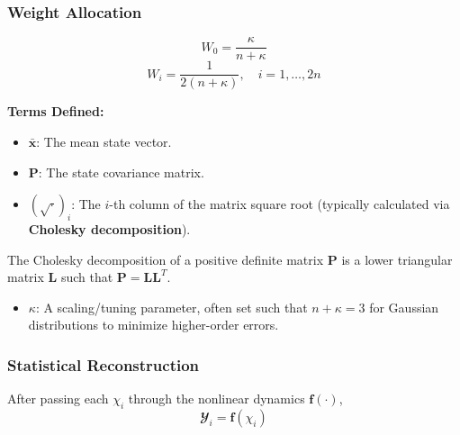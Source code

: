 \documentclass[
  letterpaper,
  DIV=11,
  numbers=noendperiod,
  oneside]{scrartcl}
\providecommand{\tightlist}{%
  \setlength{\itemsep}{0pt}\setlength{\parskip}{0pt}}
\begin{document}
\subsubsection{Weight Allocation}\label{weight-allocation}

\[W_0 = \frac{\kappa}{n + \kappa}\]
\[W_i = \frac{1}{2(n + \kappa)}, \quad i = 1, \dots, 2n\]

\textbf{Terms Defined:}

\begin{itemize}
\item
  \(\bar{\mathbf{x}}\): The mean state vector.
\item
  \(\mathbf{P}\): The state covariance matrix.
\item
  \(\left( \sqrt{\cdot} \right)_i\): The \(i\)-th column of the matrix
  square root (typically calculated via \textbf{Cholesky
  decomposition}).
\end{itemize}

\begin{tcolorbox}[enhanced jigsaw, arc=.35mm, bottomrule=.15mm, bottomtitle=1mm, breakable, colback=white, colbacktitle=quarto-callout-note-color!10!white, colframe=quarto-callout-note-color-frame, coltitle=black, left=2mm, leftrule=.75mm, opacityback=0, opacitybacktitle=0.6, rightrule=.15mm, title=\textcolor{quarto-callout-note-color}{\faInfo}\hspace{0.5em}{Cholesky Decomposition}, titlerule=0mm, toprule=.15mm, toptitle=1mm]

The Cholesky decomposition of a positive definite matrix \(\mathbf{P}\)
is a lower triangular matrix \(\mathbf{L}\) such that
\(\mathbf{P} = \mathbf{L}\mathbf{L}^T\).

\end{tcolorbox}

\begin{itemize}
\tightlist
\item
  \(\kappa\): A scaling/tuning parameter, often set such that
  \(n + \kappa = 3\) for Gaussian distributions to minimize higher-order
  errors.
\end{itemize}

\subsubsection{Statistical
Reconstruction}\label{statistical-reconstruction}

After passing each \(\chi_i\) through the nonlinear dynamics
\(\mathbf{f}(\cdot)\), \[
\mathbfcal{Y}_i = \mathbf{f}(\chi_i)
\]
\end{document}
